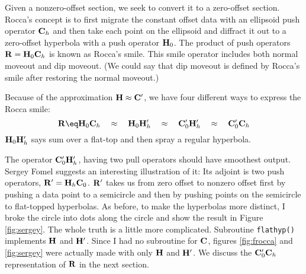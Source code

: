 \par
Given a nonzero-offset section,
we seek to convert it to a zero-offset section.
Rocca's concept is to first migrate the constant offset data
with an ellipsoid push operator $\bold C_h$
and then take each point on the ellipsoid
and diffract it out to a zero-offset hyperbola
with a push operator $\bold H_0$.
The product of push operators
$\bold R = \bold H_0 \bold C_h$
is known as Rocca's smile.
This smile operator includes both normal moveout and dip moveout.
(We could say that dip moveout is defined by Rocca's smile
after restoring the normal moveout.)

\par
Because of the approximation $\bold H \approx \bold C'$,
we have four different ways to express the Rocca smile:
\begin{equation}
\bold R \eq
		 \bold H_0 \bold C_h
\quad\approx\quad
		 \bold H_0 \bold H'_h
\quad\approx\quad
		 \bold C'_0 \bold H'_h
\quad\approx\quad
		 \bold C'_0 \bold C_h
\label{eqn:fourR}
\end{equation}
$\bold H_0 \bold H'_h$ says sum over a flat-top and then spray
a regular hyperbola.
\par
The operator $\bold C'_0 \bold H'_h$,
having two pull operators should have smoothest output.
Sergey Fomel suggests an interesting illustration of it:
Its adjoint is two push operators,
$ \bold R' = \bold H_h \bold C_0$.
$ \bold R'$ takes us from zero offset to nonzero offset
first by pushing a data point to a semicircle
and then by pushing points on the semicircle to flat-topped hyperbolas.
As before, to make the hyperbolas more distinct,
I broke the circle into dots along the circle
and show the result in Figure \ref{fig:sergey}.
The whole truth is a little more complicated.
Subroutine \texttt{flathyp()}  implements $\bold H$ and $\bold H'$.
Since I had no subroutine for $\bold C$,
figures \ref{fig:frocca} and \ref{fig:sergey}
were actually made with only $\bold H$ and $\bold H'$.
\newslide
We discuss the
$\bold C'_0 \bold C_h$
representation of $\bold R$ in the next section.

